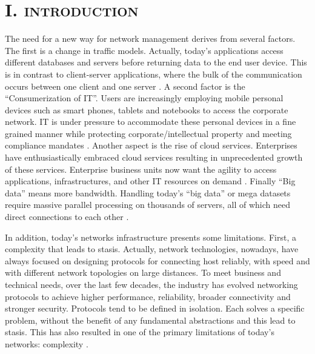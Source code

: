 %
\section*{\small \textsc{I. introduction}}
The need for a new way for network management derives from several factors. The first is a change in traffic models. Actually, today's applications access different databases and servers before returning data to the end user device. This is in contrast to client-server applications, where the bulk of the communication occurs between one client and one server \cite{onf:sdn-description:traffic-models}. A second factor is the ``Consumerization of \ac{IT}''. Users are increasingly employing mobile personal devices such as smart phones, tablets and notebooks to access the corporate network. \ac{IT} is under pressure to accommodate these personal devices in a fine grained manner while protecting corporate/intellectual property and meeting compliance mandates \cite{onf:sdn-description:consumerization-IT}. Another aspect is the rise of cloud services. Enterprises have enthusiastically embraced cloud services resulting in unprecedented growth of these services. Enterprise business units now want the agility to access applications, infrastructures, and other \ac{IT} resources on demand \cite{onf:sdn-description:cloud}. Finally ``Big data'' means more bandwidth. Handling today's ``big data'' or mega datasets require massive parallel processing on thousands of servers, all of which need direct connections to each other \cite{onf:sdn-description:big-data}.

In addition, today's networks infrastructure presents some limitations. First, a complexity that leads to stasis. Actually, network technologies, nowadays, have always focused on designing protocols for connecting host reliably, with speed and with different network topologies on large distances. To meet business and technical needs, over the last few decades, the industry has evolved networking protocols to achieve higher performance, reliability, broader connectivity and stronger security. Protocols tend to be defined in isolation. Each solves a specific problem, without the benefit of any fundamental abstractions and this lead to stasis. This has also resulted in one of the primary limitations of today's networks: complexity \cite{onf:sdn-description:stasis}.

